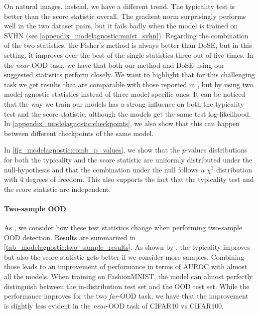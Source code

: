 {On natural images, instead, we have a different trend. The typicality test is better than the score statistic overall. The gradient norm surprisingly performs well in the two dataset pairs, but it fails badly when the model is trained on SVHN (see \cref{appendix_modelagnostic:mnist_svhn}). Regarding the combination of the two statistics, the Fisher's method is always better than DoSE, but in this setting, it improves over the best of the single statistics three out of five times.
%
In the \textit{near}-OOD task, we have that both our method and DoSE using our suggested statistics perform closely. We want to highlight that for this challenging task we get results that are comparable with those reported in \textcite{morningstar_density_2021}, but by using two model-agnostic statistics instead of three model-specific ones.
%
It can be noticed that the way we train our models has a strong influence on both the typicality test and the score statistic, although the models get the same test log-likelihood. In \cref{appendix_modelagnostic:checkpoints}, we also show that this can happen between different checkpoints of the same model.

In \cref{fig_modelagnostic:comb_p_values}, we show that the $p$-values distributions for both the typicality and the score statistic are uniformly distributed under the null-hypothesis and that the combination under the null follows a $\chi^2$ distribution with 4 degrees of freedom. This also supports the fact that the typicality test and the score statistic are independent.

\paragraph{Two-sample OOD}
As \textcite{nalisnick_detecting_2019}, we consider how these test statistics change when performing two-sample OOD detection. Results are summarized in \cref{tab_modelagnostic:two_sample_results}. As shown by \textcite{nalisnick_detecting_2019}, the typicality improves but also the score statistic gets better if we consider more samples. Combining those leads to an improvement of performance in terms of AUROC with almost all the models. When training on FashionMNIST, the model can almost perfectly distinguish between the in-distribution test set and the OOD test set. While the performance improves for the two \textit{far}-OOD task, we have that the improvement is slightly less evident in the \textit{near}-OOD task of CIFAR10 vs CIFAR100.

}
